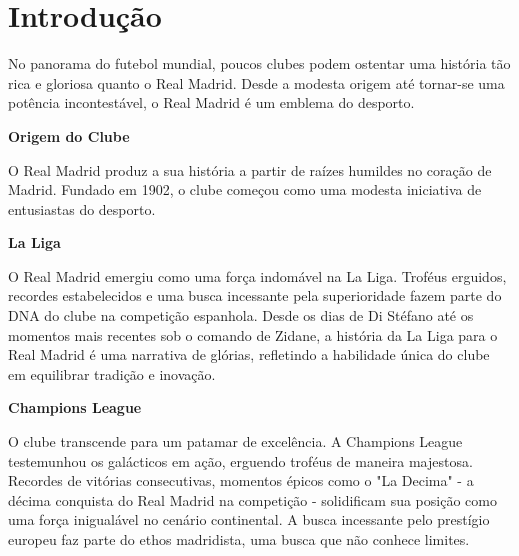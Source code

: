 \documentclass{report}
\begin{document}

\renewcommand{\contentsname}{Índice}
\tableofcontents
\listoftables     %
\listoffigures    %


\clearpage
{}

\chapter*{Introdução}
\label{chap.introducao}

No panorama do futebol mundial, poucos clubes podem ostentar uma história tão rica e gloriosa quanto o Real Madrid. Desde a modesta origem até tornar-se uma potência incontestável, o Real Madrid é um emblema do desporto. 

\vspace{1cm}

\large\textbf{Origem do Clube}

O Real Madrid \cite{realmadrid} produz a sua história a partir de raízes humildes no coração de Madrid. Fundado em 1902, o clube começou como uma modesta iniciativa de entusiastas do desporto.

\vspace{1cm}

\large\textbf{La Liga}

O Real Madrid emergiu como uma força indomável na La Liga. Troféus erguidos, recordes estabelecidos e uma busca incessante pela superioridade fazem parte do DNA do clube na competição espanhola. Desde os dias de Di Stéfano até os momentos mais recentes sob o comando de Zidane, a história da La Liga para o Real Madrid é uma narrativa de glórias, refletindo a habilidade única do clube em equilibrar tradição e inovação.

\vspace{1cm}

\large\textbf{Champions League}

O clube transcende para um patamar de excelência. A Champions League testemunhou os galácticos em ação, erguendo troféus de maneira majestosa. Recordes de vitórias consecutivas, momentos épicos como o "La Decima" - a décima conquista do Real Madrid na competição - solidificam sua posição como uma força inigualável no cenário continental. A busca incessante pelo prestígio europeu faz parte do ethos madridista, uma busca que não conhece limites.
\end{document}
